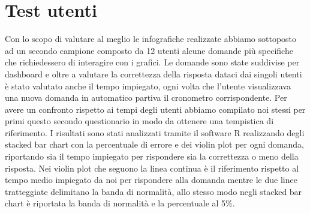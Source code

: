 \documentclass[12pt]{article}
\begin{document}
\newpage
\section{Test utenti}
Con lo scopo di valutare al meglio le infografiche realizzate abbiamo sottoposto ad un secondo campione composto da 12 utenti alcune domande più specifiche che richiedessero di interagire con i grafici. Le domande sono state suddivise per dashboard e oltre a valutare la correttezza della risposta dataci dai singoli utenti è stato valutato anche il tempo impiegato, ogni volta che l'utente visualizzava una nuova domanda in automatico partiva il cronometro corrispondente. Per avere un confronto rispetto ai tempi degli utenti abbiamo compilato noi stessi per primi questo secondo questionario in modo da ottenere una tempistica di riferimento. I risultati sono stati analizzati tramite il software R realizzando degli stacked bar chart con la percentuale di errore e dei violin plot per ogni domanda, riportando sia il tempo impiegato per rispondere sia la correttezza o meno della risposta. Nei violin plot che seguono la linea continua è il riferimento rispetto al tempo medio impiegato da noi per rispondere alla domanda mentre le due linee tratteggiate delimitano la banda di normalità, allo stesso modo negli stacked bar chart è riportata la banda di normalità e la percentuale al 5\%.
\end{document}
